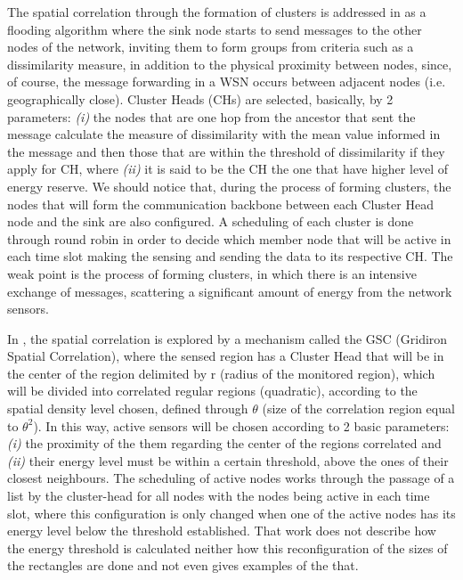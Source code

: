 \documentclass[conference]{IEEEtran}
\begin{document}
The spatial correlation through the formation of clusters is addressed in
\cite{Pham2010} as a flooding algorithm where the sink node starts to
send messages to the other nodes of the network, inviting them to form groups
from criteria such as a dissimilarity measure, in addition to the physical
proximity between nodes, since, of course, the message forwarding in a WSN
occurs between adjacent nodes (i.e. geographically close). Cluster Heads (CHs)
are selected, basically, by 2 parameters: {\it (i)} the nodes that are one hop
from the ancestor that sent the message calculate the measure of dissimilarity
with the mean value informed in the message and then those that are within the
threshold of dissimilarity if they apply for CH, where {\it (ii)} it is said to
be the CH the one that have higher level of energy reserve.
We should notice that, during the process of forming clusters, the nodes that
will form the communication backbone between each Cluster Head node and the sink
are also configured. A scheduling of each cluster is done through round robin in
order to decide which member node that will be active in each time slot making
the sensing and sending the data to its respective CH.
The weak point is the process of forming clusters, in
which there is an intensive exchange of messages, scattering a significant
amount of energy from the network sensors.

In \cite{Shah2007}, the spatial correlation is explored by a mechanism called
the GSC (Gridiron Spatial Correlation), where the sensed region has a Cluster
Head that will be in the center of the region delimited by r (radius of the
monitored region), which will be divided into correlated regular regions
(quadratic), according to the spatial density level chosen, defined through
$\theta$ (size of the correlation region equal to $\theta^2$). In this way,
active sensors will be chosen according to 2 basic parameters: {\it (i)} the
proximity of the them regarding the center of the regions correlated and {\it
(ii)} their energy level must be within a certain threshold, above the ones of
their closest neighbours. The scheduling of active nodes works through the
passage of a list by the cluster-head for all nodes with the nodes being active
in each time slot, where this configuration is only changed when one of the
active nodes has its energy level below the threshold established.
That work does not describe how the energy threshold is calculated neither how
this reconfiguration of the sizes of the rectangles are done and not even gives
examples of the that.
\end{document}

